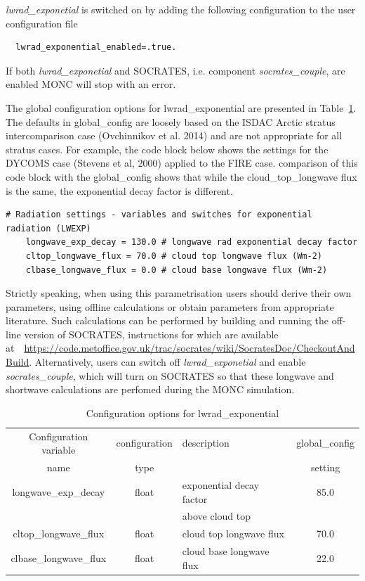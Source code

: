 \documentclass[a4paper,11pt]{article}
\begin{document}
\emph{lwrad\_exponetial} is switched on by adding the following configuration
to the user configuration file
\begin{lstlisting}
  lwrad_exponential_enabled=.true.
\end{lstlisting}
If both \emph{lwrad\_exponetial} and SOCRATES, i.e. component
\emph{socrates\_couple}, are enabled MONC will stop with an error.

The global configuration options for lwrad\_exponential are presented in
Table~\ref{tab:lwradexp}. The defaults in global\_config are loosely based on
the ISDAC Arctic stratus intercomparison case (Ovchinnikov et al. 2014) and are not
appropriate for all stratus cases. For example, the code block below shows the
settings for the DYCOMS case (Stevens et al, 2000) applied to the FIRE case.
comparison of this code block with the global\_config shows that while the
cloud\_top\_longwave flux is the same, the exponential decay factor is
different.

\begin{lstlisting}[caption={Example configuration exponential longwave parametrisation.
    Taken from testcases/stratus/fire\_sc.mcf}]
    # Radiation settings - variables and switches for exponential radiation (LWEXP)
    longwave_exp_decay = 130.0 # longwave rad exponential decay factor
    cltop_longwave_flux = 70.0 # cloud top longwave flux (Wm-2)
    clbase_longwave_flux = 0.0 # cloud base longwave flux (Wm-2)
 \end{lstlisting}

Strictly speaking, when using this parametrisation users should derive their
own parameters, using offline calculations or obtain
parameters from appropriate literature. Such calculations can be performed by building and running the off-line version of SOCRATES, instructions for which are available at~\linebreak ~\url{https://code.metoffice.gov.uk/trac/socrates/wiki/SocratesDoc/CheckoutAndBuild}. Alternatively, users can switch off
\emph{lwrad\_exponetial} and enable \emph{socrates\_couple}, which will turn
on SOCRATES so that these longwave and shortwave calculations are perfomed during
the MONC simulation.

\begin{table}[H]
  \protect\caption{Configuration options for lwrad\_exponential}
\label{tab:lwradexp}
\begin{tabular}{|c|c|l|c|}
\hline
Configuration variable & configuration & description & global\_config \tabularnewline
name & type & & setting \tabularnewline
\hline
\hline
 longwave\_exp\_decay & float & exponential decay factor & 85.0 \tabularnewline
   &   & above cloud top & \tabularnewline
 \hline
 cltop\_longwave\_flux & float & cloud top longwave flux  & 70.0 \tabularnewline
  \hline
 clbase\_longwave\_flux & float & cloud base longwave flux & 22.0 \tabularnewline
 \hline
\end{tabular}
\end{table}
\end{document}
